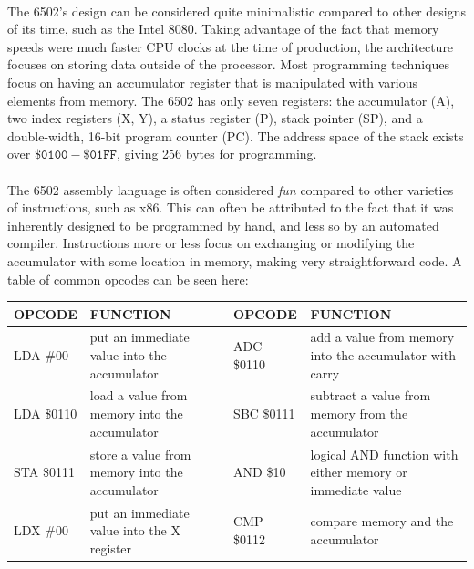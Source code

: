 \documentclass{article}
\begin{document}
\paragraph{}
The 6502's design can be considered quite minimalistic compared to other designs of its time, such as the Intel 8080. Taking advantage of the fact that memory speeds were much faster CPU clocks at the time of production, the architecture focuses on storing data outside of the processor. Most programming techniques focus on having an accumulator register that is manipulated with various elements from memory. The 6502 has only seven registers: the accumulator (A), two index registers (X, Y), a status register (P), stack pointer (SP), and a double-width, 16-bit program counter (PC). The address space of the stack exists over $\mathtt{\$0100 - \$01FF}$, giving 256 bytes for programming. 

\paragraph{}
The 6502 assembly language is often considered \textit{fun} compared to other varieties of instructions, such as x86. This can often be attributed to the fact that it was inherently designed to be programmed by hand, and less so by an automated compiler. Instructions more or less focus on exchanging or modifying the accumulator with some location in memory, making very straightforward code. A table of common opcodes can be seen here:
    \begin{center}
    \begin{tabular}{|p{2cm}|p{5cm}|p{2cm}|p{5cm}|}
    \hline
    OPCODE & FUNCTION                                       & OPCODE & FUNCTION                                                   \\ \hline
    LDA \#00       & put an immediate value into the accumulator    & ADC \$0110     & add a value from memory into the accumulator with carry    \\ \hline
    LDA \$0110     & load a value from memory into the accumulator  & SBC \$0111     & subtract a value from memory from the accumulator          \\ \hline
    STA \$0111     & store a value from memory into the accumulator & AND \$10       & logical AND function with either memory or immediate value \\ \hline
    LDX \#00       & put an immediate value into the X register     & CMP \$0112     & compare memory and the accumulator                         \\ \hline
    \end{tabular}
    \end{center}
\end{document}
